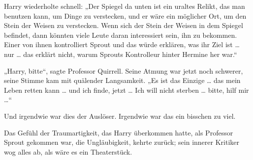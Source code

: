 Harry wiederholte schnell:
„Der Spiegel da unten ist ein uraltes Relikt, das man benutzen kann, um Dinge zu verstecken, und er wäre ein möglicher Ort, um den Stein der Weisen zu verstecken. Wenn sich der Stein der Weisen in dem Spiegel befindet, dann könnten viele Leute daran interessiert sein, ihn zu bekommen. Einer von ihnen kontrolliert Sprout und das würde erklären, was ihr Ziel ist … nur … das erklärt nicht, warum Sprouts Kontrolleur hinter Hermine her war.“

„Harry, bitte“, sagte Professor Quirrell.
Seine Atmung war jetzt noch schwerer, seine Stimme kam mit quälender Langsamkeit.
„Es ist das Einzige … das mein Leben retten kann … und ich finde, jetzt … Ich will nicht sterben … bitte, hilf mir …“

Und irgendwie war dies der Auslöser. Irgendwie war das ein bisschen zu viel.

Das Gefühl der Traumartigkeit, das Harry überkommen hatte, als Professor Sprout gekommen war, die Ungläubigkeit, kehrte zurück; sein innerer Kritiker wog alles ab, als wäre es ein Theaterstück.

